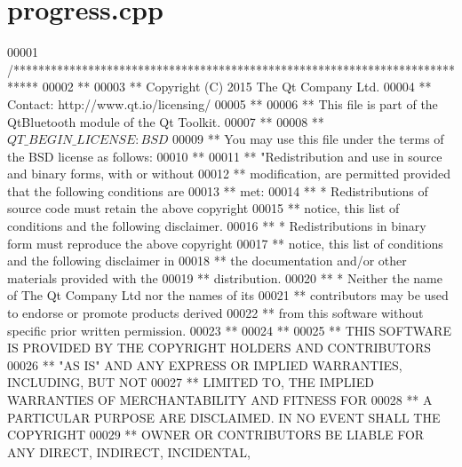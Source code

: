 \hypertarget{progress_8cpp_source}{}\section{progress.\+cpp}
\label{progress_8cpp_source}

\begin{DoxyCode}
00001 \textcolor{comment}{/****************************************************************************}
00002 \textcolor{comment}{**}
00003 \textcolor{comment}{** Copyright (C) 2015 The Qt Company Ltd.}
00004 \textcolor{comment}{** Contact: http://www.qt.io/licensing/}
00005 \textcolor{comment}{**}
00006 \textcolor{comment}{** This file is part of the QtBluetooth module of the Qt Toolkit.}
00007 \textcolor{comment}{**}
00008 \textcolor{comment}{** $QT\_BEGIN\_LICENSE:BSD$}
00009 \textcolor{comment}{** You may use this file under the terms of the BSD license as follows:}
00010 \textcolor{comment}{**}
00011 \textcolor{comment}{** "Redistribution and use in source and binary forms, with or without}
00012 \textcolor{comment}{** modification, are permitted provided that the following conditions are}
00013 \textcolor{comment}{** met:}
00014 \textcolor{comment}{**   * Redistributions of source code must retain the above copyright}
00015 \textcolor{comment}{**     notice, this list of conditions and the following disclaimer.}
00016 \textcolor{comment}{**   * Redistributions in binary form must reproduce the above copyright}
00017 \textcolor{comment}{**     notice, this list of conditions and the following disclaimer in}
00018 \textcolor{comment}{**     the documentation and/or other materials provided with the}
00019 \textcolor{comment}{**     distribution.}
00020 \textcolor{comment}{**   * Neither the name of The Qt Company Ltd nor the names of its}
00021 \textcolor{comment}{**     contributors may be used to endorse or promote products derived}
00022 \textcolor{comment}{**     from this software without specific prior written permission.}
00023 \textcolor{comment}{**}
00024 \textcolor{comment}{**}
00025 \textcolor{comment}{** THIS SOFTWARE IS PROVIDED BY THE COPYRIGHT HOLDERS AND CONTRIBUTORS}
00026 \textcolor{comment}{** "AS IS" AND ANY EXPRESS OR IMPLIED WARRANTIES, INCLUDING, BUT NOT}
00027 \textcolor{comment}{** LIMITED TO, THE IMPLIED WARRANTIES OF MERCHANTABILITY AND FITNESS FOR}
00028 \textcolor{comment}{** A PARTICULAR PURPOSE ARE DISCLAIMED. IN NO EVENT SHALL THE COPYRIGHT}
00029 \textcolor{comment}{** OWNER OR CONTRIBUTORS BE LIABLE FOR ANY DIRECT, INDIRECT, INCIDENTAL,}

\end{DoxyCode}

